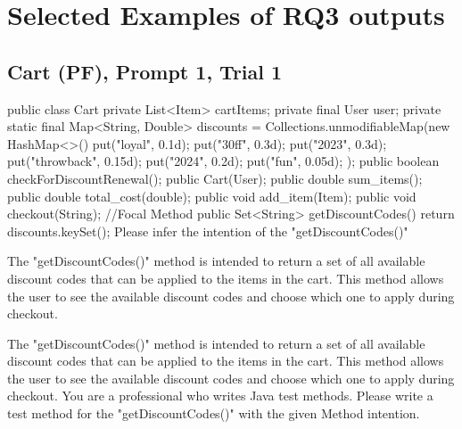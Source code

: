 \section{Selected Examples of RQ3 outputs}

\subsection{Cart (PF), Prompt 1, Trial 1}

\begin{prompt}
  public class Cart {
    private List<Item> cartItems;
    private final User user;
    private static final Map<String, Double> discounts = Collections.unmodifiableMap(new HashMap<>() {{
        put("loyal", 0.1d);
        put("30ff", 0.3d); put("2023", 0.3d);
        put("throwback", 0.15d); put("2024", 0.2d);
        put("fun", 0.05d);
    }});
    public boolean checkForDiscountRenewal();
    public Cart(User);
    public double sum_items();
    public double total_cost(double);
    public void add_item(Item);
    public void checkout(String);
    //Focal Method
    public Set<String> getDiscountCodes() {
        return discounts.keySet();
    }
}
Please infer the intention of the "getDiscountCodes()"
\end{prompt}

\begin{response}
The "getDiscountCodes()" method is intended to return a set of all available discount codes that can be applied to the items in the cart. This method allows the user to see the available discount codes and choose which one to apply during checkout.
\end{response}

\begin{prompt}
The "getDiscountCodes()" method is intended to return a set of all available discount codes that can be applied to the items in the cart. This method allows the user to see the available discount codes and choose which one to apply during checkout.
You are a professional who writes Java test methods. Please write a test method for the "getDiscountCodes()" with the given Method intention.  
\end{prompt}

